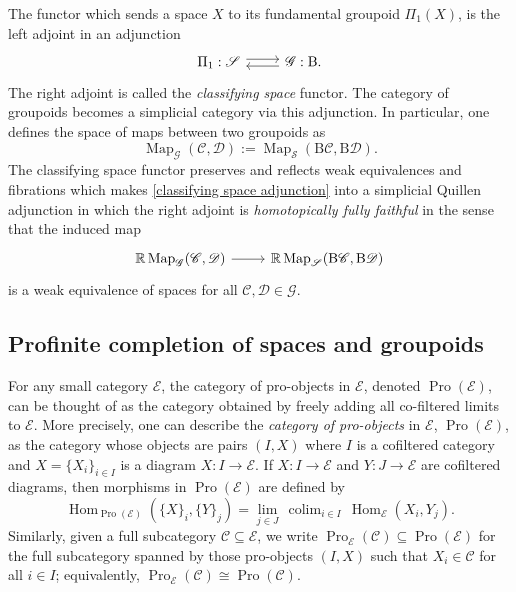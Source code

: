 \documentclass{amsart}
\newcommand{\bE}{\mathscr{E}}
\newcommand{\sSet}{\mathscr{S}}
\newcommand{\Grpd}{\mathscr{G}}
\DeclareMathOperator*{\colim}{colim}
\newcommand{\Pro}{\operatorname{Pro}}
\newcommand{\cs}{\mathrm{B}}
\newcommand{\Hom}{\operatorname{Hom}}
\newcommand{\Map}{\operatorname{Map}}
\theoremstyle{definition}
\numberwithin{equation}{section}
\begin{document}
The functor which sends a space $X$ to its fundamental groupoid $\Pi_1(X)$, is the left adjoint in an adjunction \begin{equation}\label{classifying space adjunction}\begin{tikzcd} \Pi_{1}:\sSet  \arrow[r, shift left =1]& \arrow[l, shift left =1]\Grpd: \cs. \end{tikzcd}\end{equation} The right adjoint is called the \emph{classifying space} functor. The category of groupoids becomes a simplicial category via this adjunction. In particular, one defines the space of maps between two groupoids as \[\Map_{\Grpd}(\mathscr{C}, \mathscr{D}):=\Map_{\sSet}(\cs\mathscr{C}, \cs\mathscr{D}).\]  The classifying space functor preserves and reflects weak equivalences and fibrations which makes \eqref{classifying space adjunction} into a simplicial Quillen adjunction in which the right adjoint is \emph{homotopically fully faithful} in the sense that the induced map \[\begin{tikzcd}\mathbb{R}\Map_{\Grpd}(\mathscr{C},\mathscr{D})\arrow[r]& \mathbb{R}\Map_{\sSet}(\cs \mathscr{C},\cs \mathscr{D})\end{tikzcd}\] is a weak equivalence of spaces for all $\mathscr{C},\mathscr{D}\in\Grpd$. 

\subsection{Profinite completion of spaces and groupoids}
For any small category $\bE$, the category of pro-objects in $\bE$, denoted $\Pro(\bE)$, can be thought of as the category obtained by freely adding all co-filtered limits to $\bE$. More precisely, one can describe the \emph{category of pro-objects} in $\bE$, $\Pro(\bE)$, as the category whose objects are pairs $(I,X)$ where $I$ is a cofiltered category and $X=\{X_{i}\}_{i\in I}$ is a diagram $X:I\rightarrow \bE$. If $X:I\to\bE$ and $Y:J\to\bE$ are cofiltered diagrams, then morphisms in $\Pro(\bE)$ are defined by
\[
\Hom_{\Pro(\bE)}(\{X\}_{i}, \{Y\}_{j})
=\lim_{j\in J}\,\colim_{i\in I}\,\Hom_{\bE}(X_i,Y_j).
\]
Similarly, given a full subcategory $\mathscr{C}\subseteq \bE$, we write $\Pro_{\bE}(\mathscr{C})\subseteq \Pro(\bE)$ for the full subcategory spanned by those pro-objects $(I,X)$ such that $X_i\in \mathscr{C}$ for all $i\in I$; equivalently, $\Pro_{\bE}(\mathscr{C})\cong \Pro(\mathscr{C})$.
\end{document}
